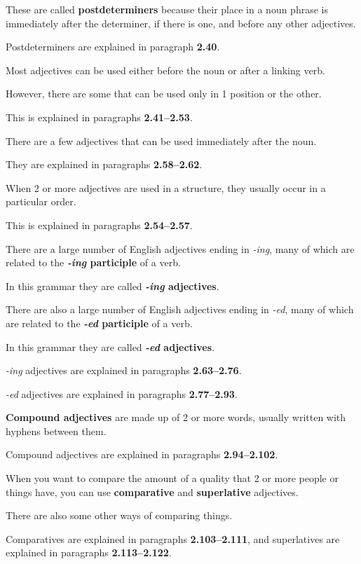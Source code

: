 \documentclass[oneside]{book}
\numberwithin{equation}{section}
\begin{document}
%
These are called \textbf{postdeterminers} because their place in a noun phrase is immediately after the determiner, if there is one, and before any other adjectives.

%
Postdeterminers are explained in paragraph \textbf{2.40}.

%
\noindent{} Most adjectives can be used either before the noun or after a linking verb.

However, there are some that can be used only in 1 position or the other.

This is explained in paragraphs \textbf{2.41--2.53}.

%
\noindent{} There are a few adjectives that can be used immediately after the noun.

They are explained in paragraphs \textbf{2.58--2.62}.

%
\noindent{} When 2 or more adjectives are used in a structure, they usually occur in a particular order.

This is explained in paragraphs \textbf{2.54--2.57}.

%
\noindent{} There are a large number of English adjectives ending in \textit{-ing}, many of which are related to the \textbf{\textit{-ing} participle} of a verb.

In this grammar they are called \textbf{\textit{-ing} adjectives}.

%
There are also a large number of English adjectives ending in \textit{-ed}, many of which are related to the \textbf{\textit{-ed} participle} of a verb.

In this grammar they are called \textbf{\textit{-ed} adjectives}.

%
\textit{-ing} adjectives are explained in paragraphs \textbf{2.63--2.76}.

\textit{-ed} adjectives are explained in paragraphs \textbf{2.77--2.93}.

%
\noindent{} \textbf{Compound adjectives} are made up of 2 or more words, usually written with hyphens between them.

%
Compound adjectives are explained in paragraphs \textbf{2.94--2.102}.

%
\noindent{} When you want to compare the amount of a quality that 2 or more people or things have, you can use \textbf{comparative} and \textbf{superlative} adjectives.

There are also some other ways of comparing things.

%
Comparatives are explained in paragraphs \textbf{2.103--2.111}, and superlatives are explained in paragraphs \textbf{2.113--2.122}.
\end{document}

